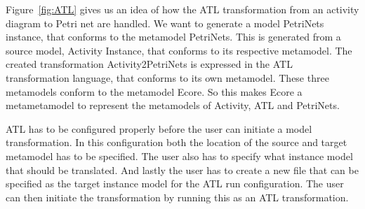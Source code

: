 Figure~\ref{fig:ATL} gives us an idea of how the ATL transformation from an activity
diagram to Petri net are handled. We want to generate a model PetriNets
instance, that conforms to the metamodel PetriNets. This is generated from a
source model, Activity Instance, that conforms to its respective metamodel.
The created transformation Activity2PetriNets is expressed in the ATL
transformation  language, that conforms to its own metamodel. These three
metamodels conform to the metamodel Ecore. So this makes Ecore a metametamodel
to represent the metamodels of Activity, ATL and PetriNets.

ATL has to be configured properly before the user can initiate a model
transformation. In this configuration both the location of the source and target
metamodel has to be specified. The user also has to specify what instance model
that should be translated. And lastly the user has to create a new file that can
be specified as the target instance model for the ATL run configuration. The
user can then initiate the transformation by running this as an ATL
transformation.
